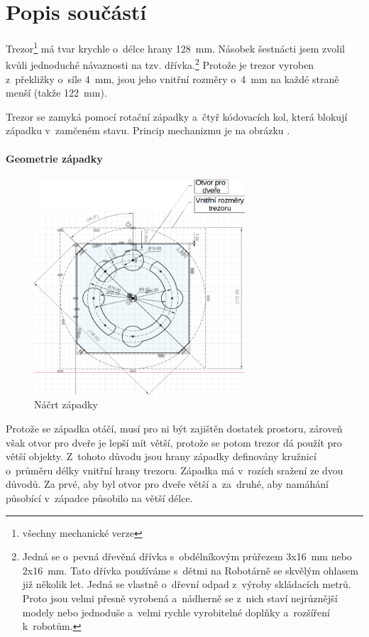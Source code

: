 \section{Popis součástí}

Trezor\footnote{všechny mechanické verze} má tvar krychle o~délce hrany 128~mm. Násobek šestnácti jsem zvolil kvůli jednoduché návaznosti na tzv. dřívka.\footnote
{  
    Jedná se o~pevná dřevěná dřívka s~obdélníkovým průřezem 3x16~mm nebo 2x16~mm. Tato dřívka používáme s~dětmi na Robotárně se skvělým ohlasem již několik 
    let. Jedná se vlastně o~dřevní odpad z~výroby skládacích metrů. Proto jsou velmi přesně vyrobená a~nádherně se z~nich staví nejrůznější modely nebo 
    jednoduše a~velmi rychle vyrobitelné doplňky a~rozšíření k~robotům.
}
Protože je trezor vyroben z~překližky o~síle 4~mm, jsou jeho vnitřní rozměry o~4~mm na každé straně menší (takže 122~mm).

Trezor se zamyká pomocí rotační západky a~čtyř kódovacích kol, která blokují západku v~zamčeném stavu. 
Princip mechanizmu je na obrázku .

\paragraph{Geometrie západky}
\begin{figure}[h]
	\centering
    \includegraphics[width=0.7\textwidth]{kapitoly/obrazky/M3/geometrie_zapadky.png}
    \caption{Náčrt západky}
    \label{fig:M3-geometrie-zapadky}
\end{figure} 

Protože se západka otáčí, musí pro ni být zajištěn dostatek prostoru, zároveň však otvor pro dveře je lepší mít větší, protože se potom trezor dá použít pro větší objekty.
Z~tohoto důvodu jsou hrany západky definovány kružnicí o~průměru délky vnitřní hrany trezoru. Západka má v~rozích sražení ze dvou důvodů. Za prvé, aby byl otvor pro
dveře větší a~za~druhé, aby namáhání působící v~západce působilo na větší délce.


